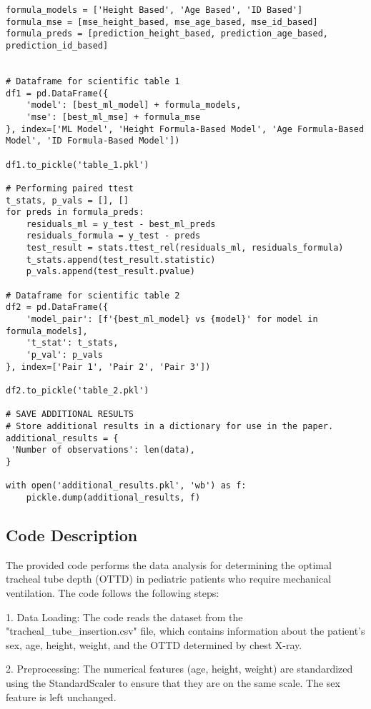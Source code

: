 \documentclass[11pt]{article}
\begin{document}
\begin{verbatim}
formula_models = ['Height Based', 'Age Based', 'ID Based']
formula_mse = [mse_height_based, mse_age_based, mse_id_based]
formula_preds = [prediction_height_based, prediction_age_based, prediction_id_based]


# Dataframe for scientific table 1
df1 = pd.DataFrame({
    'model': [best_ml_model] + formula_models,
    'mse': [best_ml_mse] + formula_mse
}, index=['ML Model', 'Height Formula-Based Model', 'Age Formula-Based Model', 'ID Formula-Based Model'])

df1.to_pickle('table_1.pkl')

# Performing paired ttest
t_stats, p_vals = [], []
for preds in formula_preds:
    residuals_ml = y_test - best_ml_preds
    residuals_formula = y_test - preds
    test_result = stats.ttest_rel(residuals_ml, residuals_formula)
    t_stats.append(test_result.statistic)
    p_vals.append(test_result.pvalue)

# Dataframe for scientific table 2
df2 = pd.DataFrame({
    'model_pair': [f'{best_ml_model} vs {model}' for model in formula_models],
    't_stat': t_stats,
    'p_val': p_vals
}, index=['Pair 1', 'Pair 2', 'Pair 3'])

df2.to_pickle('table_2.pkl')

# SAVE ADDITIONAL RESULTS
# Store additional results in a dictionary for use in the paper.
additional_results = {
 'Number of observations': len(data),
}

with open('additional_results.pkl', 'wb') as f:
    pickle.dump(additional_results, f)

\end{verbatim}

\subsection{Code Description}

The provided code performs the data analysis for determining the optimal tracheal tube depth (OTTD) in pediatric patients who require mechanical ventilation. The code follows the following steps:

1. Data Loading: The code reads the dataset from the "tracheal\_tube\_insertion.csv" file, which contains information about the patient's sex, age, height, weight, and the OTTD determined by chest X-ray.

2. Preprocessing: The numerical features (age, height, weight) are standardized using the StandardScaler to ensure that they are on the same scale. The sex feature is left unchanged.
\end{document}
